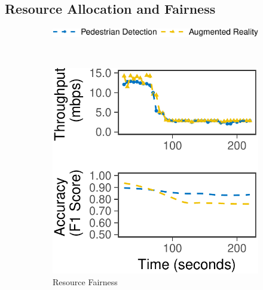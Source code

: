 \subsection{Resource Allocation and Fairness}
\label{sec:multi-task-alloc}
\begin{figure}
  \centering
  \begin{subfigure}[t]{0.7\columnwidth}
    \centering
    \includegraphics[width=\textwidth]{figures/multitask-legend.pdf}
  \end{subfigure}
  \\
  \vspace{0.4em}
  \begin{subfigure}[t]{0.45\columnwidth}
    \centering
    \includegraphics[width=\textwidth]{figures/multitask-left.pdf}
    \caption{Resource Fairness}
    \label{fig:eq-bw}
  \end{subfigure}
  \hfill
  \begin{subfigure}[t]{0.45\columnwidth}
    \centering

\end{subfigure}
\end{figure}
